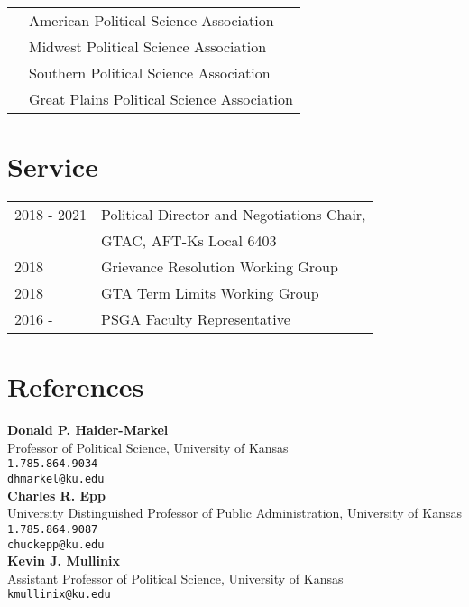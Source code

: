 \documentclass[margin,line,pifont,palatino,courier]{res}
\begin{document}
\begin{resume}
\begin{tabular}{@{}p{0.8in}p{4in}}
  & American Political Science Association\\
  & Midwest Political Science Association\\
  & Southern Political Science Association\\
  & Great Plains Political Science Association\\
\end{tabular}


\section{\sc Service}

\begin{tabular}{@{}p{0.8in}p{4in}}
  2018 - 2021 & Political Director and Negotiations Chair,\\
              &  GTAC, AFT-Ks Local 6403 \\
  2018 & Grievance Resolution Working Group \\
  2018 & GTA Term Limits Working Group\\
  2016 - & PSGA Faculty Representative\\
\end{tabular}


\section{\sc References}

\textbf{Donald P. Haider-Markel} \\
Professor of Political Science, University of Kansas \\
\verb+1.785.864.9034+\\
\texttt{dhmarkel@ku.edu}\\



\textbf{Charles R. Epp} \\
University Distinguished Professor of Public Administration, University of Kansas \\
\verb+1.785.864.9087+\\
\texttt{chuckepp@ku.edu}\\

\textbf{Kevin J. Mullinix} \\
Assistant Professor of Political Science, University of Kansas \\
\texttt{kmullinix@ku.edu}\\

\end{resume}
\end{document}
